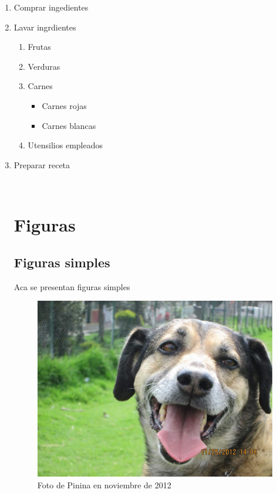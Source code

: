 \documentclass{article}
\begin{document}
\begin{enumerate}
	\item Comprar ingedientes
	\item Lavar ingrdientes
		\begin{enumerate}[label=\alph*)]
			\item Frutas
			\item Verduras
			\item Carnes
			\begin{itemize}
				\item Carnes rojas
				\item Carnes blancas
			\end{itemize}
			\item Utensilios empleados
		\end{enumerate}
	\item Preparar receta
		\begin{enumerate}[label=\alph*)]
			\

\end{enumerate}

\section{Figuras}

\subsection{Figuras simples}

Aca se presentan figuras simples

\begin{figure}[!h]

	\centering
	\includegraphics[width = 1\textwidth]{Imagenes/Pinina.jpg}
	\caption{Foto de Pinina en noviembre de 2012}
	\label{Pinina}
	

\end{figure}
\end{enumerate}
\end{document}
